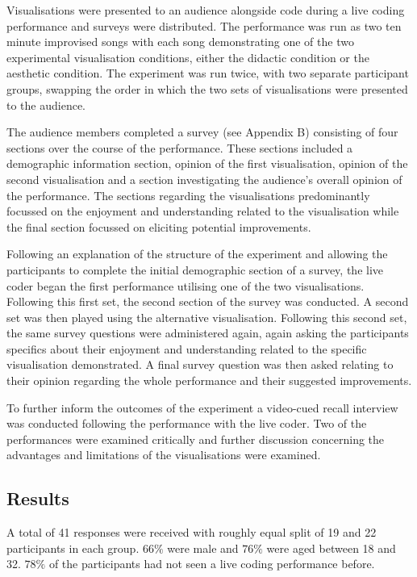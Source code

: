 \documentclass{sig-alternate}
\begin{document}
Visualisations were presented to an audience alongside code during a live coding performance and surveys were distributed. The performance was run as two ten minute improvised songs with each song demonstrating one of the two experimental visualisation conditions, either the didactic condition or the aesthetic condition. The experiment was run twice, with two separate participant groups, swapping the order in which the two sets of visualisations were presented to the audience.

The audience members completed a survey (see Appendix B) consisting of four sections over the course of the performance. These sections included a demographic information section, opinion of the first visualisation, opinion of the second visualisation and a section investigating the audience's overall opinion of the performance. The sections regarding the visualisations predominantly focussed on the enjoyment and understanding related to the visualisation while the final section focussed on eliciting potential improvements.

Following an explanation of the structure of the experiment and allowing the participants to complete the initial demographic section of a survey, the live coder began the first performance utilising one of the two visualisations. Following this first set, the second section of the survey was conducted. A second set was then played using the alternative visualisation. Following this second set, the same survey questions were administered again, again asking the participants specifics about their enjoyment and understanding related to the specific visualisation demonstrated. A final survey question was then asked relating to their opinion regarding the whole performance and their suggested improvements.

To further inform the outcomes of the experiment a video-cued recall interview was conducted following the performance with the live coder. Two of the performances were examined critically and further discussion concerning the advantages and limitations of the visualisations were examined.

\subsection{Results}

A total of 41 responses were received with roughly equal split of 19 and 22 participants in each group. $66\%$ were male and $76\%$ were aged between 18 and 32. $78\%$ of the participants had not seen a live coding performance before.
\end{document}
